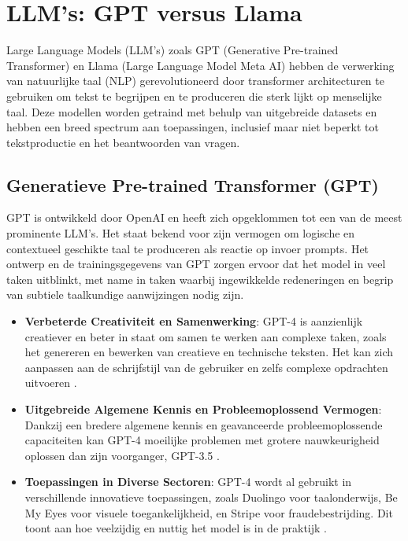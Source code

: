 \section{LLM's: GPT versus Llama}

Large Language Models (LLM's) zoals GPT (Generative Pre-trained Transformer) en Llama (Large Language Model Meta AI) hebben de verwerking van natuurlijke taal (NLP) gerevolutioneerd  door  transformer architecturen te gebruiken om tekst te begrijpen en te produceren die sterk lijkt op menselijke taal. Deze modellen worden getraind met behulp van uitgebreide datasets en hebben een breed spectrum aan toepassingen, inclusief maar niet beperkt tot tekstproductie en het beantwoorden van vragen.


\subsection{Generatieve Pre-trained Transformer (GPT)}

GPT is ontwikkeld door OpenAI en heeft zich opgeklommen tot een van de meest prominente LLM's. Het staat bekend voor zijn vermogen om logische en contextueel geschikte taal te produceren als reactie op invoer prompts. Het ontwerp en de trainingsgegevens van GPT zorgen ervoor dat het model in veel taken uitblinkt, met name in taken waarbij ingewikkelde redeneringen en begrip van subtiele taalkundige aanwijzingen nodig zijn.



\begin{itemize}
    \item \textbf{Verbeterde Creativiteit en Samenwerking}: GPT-4 is aanzienlijk creatiever en beter in staat om samen te werken aan complexe taken, zoals het genereren en bewerken van creatieve en technische teksten. Het kan zich aanpassen aan de schrijfstijl van de gebruiker en zelfs complexe opdrachten uitvoeren \autocite{openai_gpt4}.
    \item \textbf{Uitgebreide Algemene Kennis en Probleemoplossend Vermogen}: Dankzij een bredere algemene kennis en geavanceerde probleemoplossende capaciteiten kan GPT-4 moeilijke problemen met grotere nauwkeurigheid oplossen dan zijn voorganger, GPT-3.5 \autocite{openai_gpt4}.
    \item \textbf{Toepassingen in Diverse Sectoren}: GPT-4 wordt al gebruikt in verschillende innovatieve toepassingen, zoals Duolingo voor taalonderwijs, Be My Eyes voor visuele toegankelijkheid, en Stripe voor fraudebestrijding. Dit toont aan hoe veelzijdig en nuttig het model is in de praktijk \autocite{openai_gpt4}.
\end{itemize}

